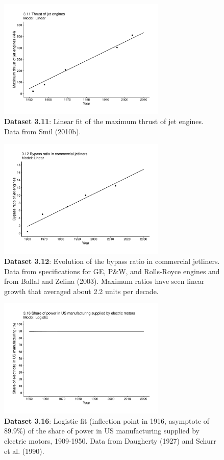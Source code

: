 \documentclass[aps,rmp,preprint,superscriptaddress,10pt,onecolumn]{article}
\begin{document}
\begin{figure}[h]
\includegraphics[width=8cm]{output/figs-ggplot/3.11.pdf}
\caption{\textbf{Dataset 3.11}: Linear fit of the maximum thrust of jet engines. Data from Smil (2010b).}
\end{figure}
	
\begin{figure}[h]
\includegraphics[width=8cm]{output/figs-ggplot/3.12.pdf}
\caption{\textbf{Dataset 3.12}: Evolution of the bypass ratio in commercial jetliners. Data from specifications for GE, P&W, and Rolls-Royce engines and from Ballal and Zelina (2003). Maximum ratios have seen linear growth that averaged about 2.2 units per decade.}
\end{figure}
	
\begin{figure}[h]
\includegraphics[width=8cm]{output/figs-ggplot/3.16.pdf}
\caption{\textbf{Dataset 3.16}: Logistic fit (inflection point in 1916, asymptote of 89.9\%) of the share of power in US manufacturing supplied by electric motors, 1909-1950. Data from Daugherty (1927) and Schurr et al. (1990).}
\end{figure}
	
\end{document}
